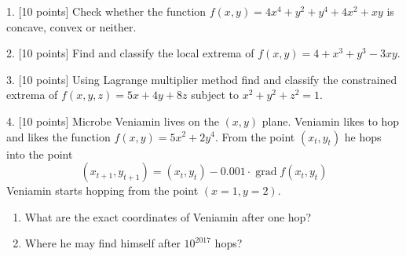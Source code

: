 \documentclass[12pt,a4paper]{article}
\DeclareMathOperator{\grad}{grad}
\begin{document}

1. {[10 points]} Check whether the function $f(x,y)= 4x^4 + y^2+y^4+4x^2+xy$ is concave, convex or neither.

\newpage
{}

2. {[10 points]} Find and classify the local extrema of $f(x,y) = 4 + x^3 + y^3 - 3xy$.

\newpage
{}

3. {[10 points]} Using Lagrange multiplier method find and classify the constrained extrema of $f(x, y, z) =  5x +4y + 8z$ subject to $x^2 + y^2 + z^2 = 1$.



\newpage
{}

4. {[10 points]} Microbe Veniamin lives on the $(x, y)$ plane. Veniamin likes to hop and likes the function $f(x, y) = 5x^2 + 2y^4$. From the point $(x_t, y_t)$ he hops into the point
\[
(x_{t+1},y_{t+1})=(x_t, y_t) - 0.001\cdot \grad f(x_t, y_t)
\]
Veniamin starts hopping from the point $(x=1, y =2)$.

\begin{enumerate}
  \item What are the exact coordinates of Veniamin after one hop?
  \item Where he may find himself after $10^{2017}$ hops?
\end{enumerate}
\end{document}
